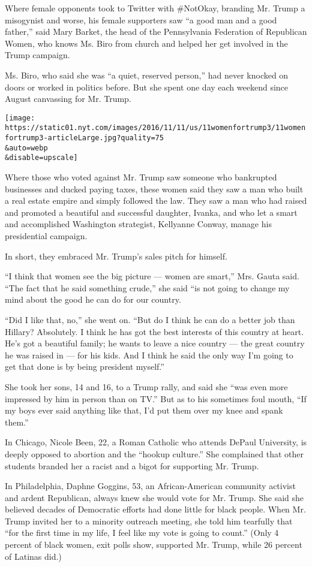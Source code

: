 Where female opponents took to Twitter with \#NotOkay, branding Mr.
Trump a misogynist and worse, his female supporters saw ``a good man and
a good father,'' said Mary Barket, the head of the Pennsylvania
Federation of Republican Women, who knows Ms. Biro from church and
helped her get involved in the Trump campaign.

Ms. Biro, who said she was ``a quiet, reserved person,'' had never
knocked on doors or worked in politics before. But she spent one day
each weekend since August canvassing for Mr. Trump.

\texttt{[image: https://static01.nyt.com/images/2016/11/11/us/11womenfortrump3/11womenfortrump3-articleLarge.jpg?quality=75\\\&auto=webp\\\&disable=upscale]}

Where those who voted against Mr. Trump saw someone who bankrupted
businesses and ducked paying taxes, these women said they saw a man who
built a real estate empire and simply followed the law. They saw a man
who had raised and promoted a beautiful and successful daughter, Ivanka,
and who let a smart and accomplished Washington strategist, Kellyanne
Conway, manage his presidential campaign.

In short, they embraced Mr. Trump's sales pitch for himself.

``I think that women see the big picture --- women are smart,'' Mrs.
Gauta said. ``The fact that he said something crude,'' she said ``is not
going to change my mind about the good he can do for our country.

``Did I like that, no,'' she went on. ``But do I think he can do a
better job than Hillary? Absolutely. I think he has got the best
interests of this country at heart. He's got a beautiful family; he
wants to leave a nice country --- the great country he was raised in ---
for his kids. And I think he said the only way I'm going to get that
done is by being president myself.''

She took her sons, 14 and 16, to a Trump rally, and said she ``was even
more impressed by him in person than on TV.'' But as to his sometimes
foul mouth, ``If my boys ever said anything like that, I'd put them over
my knee and spank them.''

In Chicago, Nicole Been, 22, a Roman Catholic who attends DePaul
University, is deeply opposed to abortion and the ``hookup culture.''
She complained that other students branded her a racist and a bigot for
supporting Mr. Trump.

In Philadelphia, Daphne Goggins, 53, an African-American community
activist and ardent Republican, always knew she would vote for Mr.
Trump. She said she believed decades of Democratic efforts had done
little for black people. When Mr. Trump invited her to a minority
outreach meeting, she told him tearfully that ``for the first time in my
life, I feel like my vote is going to count.'' (Only 4 percent of black
women, exit polls show, supported Mr. Trump, while 26 percent of Latinas
did.)

